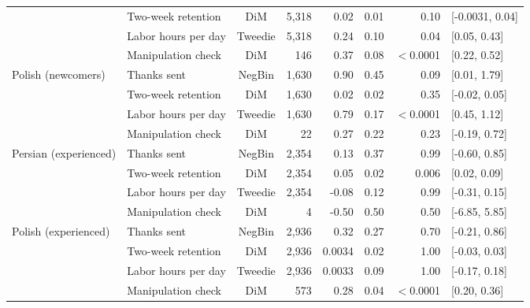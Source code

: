 \begin{table}[ht]
\begin{tabular}{llcrrrrl}
 & Two-week retention & DiM & 5,318 & 0.02 & 0.01 & 0.10 & [-0.0031, 0.04] \\
 & Labor hours per day & Tweedie & 5,318 & 0.24 & 0.10 & 0.04 & [0.05, 0.43] \\
 & Manipulation check & DiM & 146 & 0.37 & 0.08 & $<$0.0001 & [0.22, 0.52] \\
\addlinespace
Polish (newcomers) & Thanks sent & NegBin & 1,630 & 0.90 & 0.45 & 0.09 & [0.01, 1.79] \\
 & Two-week retention & DiM & 1,630 & 0.02 & 0.02 & 0.35 & [-0.02, 0.05] \\
 & Labor hours per day & Tweedie & 1,630 & 0.79 & 0.17 & $<$0.0001 & [0.45, 1.12] \\
 & Manipulation check & DiM & 22 & 0.27 & 0.22 & 0.23 & [-0.19, 0.72] \\
\addlinespace
Persian (experienced) & Thanks sent & NegBin & 2,354 & 0.13 & 0.37 & 0.99 & [-0.60, 0.85] \\
 & Two-week retention & DiM & 2,354 & 0.05 & 0.02 & 0.006 & [0.02, 0.09] \\
 & Labor hours per day & Tweedie & 2,354 & -0.08 & 0.12 & 0.99 & [-0.31, 0.15] \\
 & Manipulation check & DiM & 4 & -0.50 & 0.50 & 0.50 & [-6.85, 5.85] \\
\addlinespace
Polish (experienced) & Thanks sent & NegBin & 2,936 & 0.32 & 0.27 & 0.70 & [-0.21, 0.86] \\
 & Two-week retention & DiM & 2,936 & 0.0034 & 0.02 & 1.00 & [-0.03, 0.03] \\
 & Labor hours per day & Tweedie & 2,936 & 0.0033 & 0.09 & 1.00 & [-0.17, 0.18] \\
 & Manipulation check & DiM & 573 & 0.28 & 0.04 & $<$0.0001 & [0.20, 0.36] \\
\bottomrule
\end{tabular}
\end{table}
